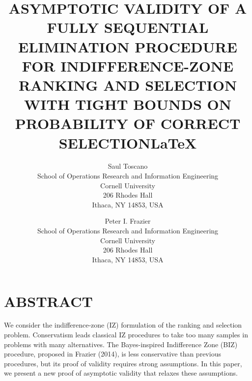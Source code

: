 \documentclass{wscpaperproc}
\theoremstyle{wsc}
\begin{document}
%
%

\title{ASYMPTOTIC VALIDITY OF A FULLY SEQUENTIAL ELIMINATION PROCEDURE FOR INDIFFERENCE-ZONE RANKING AND SELECTION WITH TIGHT BOUNDS ON PROBABILITY OF CORRECT SELECTION\LaTeX}

\author{Saul Toscano\\ [12pt]
School of Operations Research and Information Engineering\\
Cornell University \\ 
206 Rhodes Hall \\
Ithaca, NY 14853, USA\\
\and
Peter I. Frazier\\ [12pt]
School of Operations Research and Information Engineering \\
Cornell University \\ 
206 Rhodes Hall \\
Ithaca, NY 14853, USA
}






\maketitle

\section*{ABSTRACT}
We consider the indifference-zone (IZ) formulation of the ranking
and selection problem. Conservatism leads classical IZ procedures
to take too many samples in problems with many alternatives. The Bayes-inspired
Indifference Zone (BIZ) procedure, proposed in Frazier (2014), is
less conservative than previous procedures, but its proof of validity
requires strong assumptions. In this paper, we present a new proof
of asymptotic validity that relaxes these assumptions.
\end{document}
